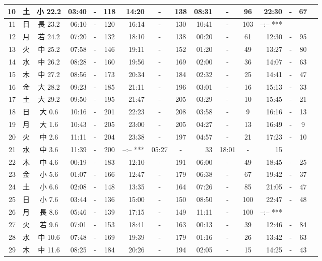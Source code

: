 \documentclass[12pt.a4j]{jsarticle}
\begin{document}
\begin{center}
\begin{table}[ht]
\begin{tabular}{|rc|cr|ccrccr|ccrccr|}
\hline
10 & 土 & 小 22.2 & 03:40 &-& 118 & 14:20 &-& 138 & 08:31 &-&  96 & 22:30 &-&  67 \\
\hline
11 & 日 & 長 23.2 & 06:10 &-& 120 & 16:14 &-& 130 & 10:41 &-& 103 & --:--   *** \\
\hline
12 & 月 & 若 24.2 & 07:20 &-& 132 & 18:10 &-& 138 & 00:20 &-&  61 & 12:30 &-&  95 \\
\hline
13 & 火 & 中 25.2 & 07:58 &-& 146 & 19:11 &-& 152 & 01:20 &-&  49 & 13:27 &-&  80 \\
\hline
14 & 水 & 中 26.2 & 08:28 &-& 160 & 19:56 &-& 169 & 02:00 &-&  36 & 14:07 &-&  63 \\
\hline
15 & 木 & 中 27.2 & 08:56 &-& 173 & 20:34 &-& 184 & 02:32 &-&  25 & 14:41 &-&  47 \\
\hline
16 & 金 & 大 28.2 & 09:23 &-& 185 & 21:11 &-& 196 & 03:01 &-&  16 & 15:13 &-&  33 \\
\hline
17 & 土 & 大 29.2 & 09:50 &-& 195 & 21:47 &-& 205 & 03:29 &-&  10 & 15:45 &-&  21 \\
\hline
18 & 日 & 大  0.6 & 10:16 &-& 201 & 22:23 &-& 208 & 03:58 &-&   9 & 16:16 &-&  13 \\
\hline
19 & 月 & 大  1.6 & 10:43 &-& 205 & 23:00 &-& 205 & 04:27 &-&  13 & 16:49 &-&   9 \\
\hline
20 & 火 & 中  2.6 & 11:11 &-& 204 & 23:38 &-& 197 & 04:57 &-&  21 & 17:23 &-&  10 \\
\hline
21 & 水 & 中  3.6 & 11:39 &-& 200 & --:--   *** & 05:27 &-&  33 & 18:01 &-&  15 \\
\hline
22 & 木 & 中  4.6 & 00:19 &-& 183 & 12:10 &-& 191 & 06:00 &-&  49 & 18:45 &-&  25 \\
\hline
23 & 金 & 小  5.6 & 01:07 &-& 166 & 12:47 &-& 179 & 06:38 &-&  67 & 19:42 &-&  37 \\
\hline
24 & 土 & 小  6.6 & 02:08 &-& 148 & 13:35 &-& 164 & 07:26 &-&  85 & 21:05 &-&  47 \\
\hline
25 & 日 & 小  7.6 & 03:44 &-& 136 & 15:00 &-& 150 & 08:50 &-& 100 & 22:47 &-&  48 \\
\hline
26 & 月 & 長  8.6 & 05:46 &-& 139 & 17:15 &-& 149 & 11:11 &-& 100 & --:--   *** \\
\hline
27 & 火 & 若  9.6 & 07:01 &-& 153 & 18:41 &-& 163 & 00:13 &-&  39 & 12:46 &-&  84 \\
\hline
28 & 水 & 中 10.6 & 07:48 &-& 169 & 19:39 &-& 179 & 01:16 &-&  26 & 13:42 &-&  63 \\
\hline
29 & 木 & 中 11.6 & 08:25 &-& 184 & 20:26 &-& 194 & 02:05 &-&  15 & 14:25 &-&  43 \\

\end{tabular}
\end{table}
\end{center}
\end{document}
